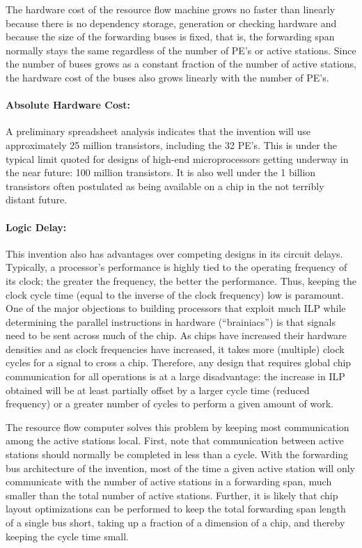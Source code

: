 \documentclass[10pt,dvips]{article}
\begin{document}
The hardware cost of the resource flow machine grows no faster than
linearly because there is no dependency storage, generation or checking
hardware and because the size of the forwarding buses is fixed, that is,
the forwarding span normally stays the same regardless of the number
of PE's or active stations. Since the number of buses grows as a constant
fraction of the number of active stations, the hardware cost of the
buses also grows linearly with the number of PE's.

\paragraph{Absolute Hardware Cost: }
A preliminary spreadsheet analysis indicates that the invention will use
approximately 25 million transistors, including the 32 PE's. This is
under the typical limit quoted for designs of high-end microprocessors
getting underway in the near future: 100 million transistors. It is
also well under the 1 billion transistors often postulated as being
available on a chip in the not terribly distant future.

\paragraph{Logic Delay: }
This invention also has advantages over competing designs in its circuit
delays. Typically, a processor's performance is highly tied to the
operating frequency of its clock; the greater the frequency, the better
the performance. Thus, keeping the clock cycle time (equal to the inverse
of the clock frequency) low is paramount. One of the major objections to
building processors that exploit much ILP while determining the parallel
instructions in hardware (``brainiacs'') is that signals need to be
sent across much of the chip. As chips have increased their hardware
densities and as clock frequencies have increased, it takes more (multiple)
clock cycles for a signal to cross a chip. Therefore, any design that
requires global chip communication for all operations is at a large
disadvantage: the increase in ILP obtained will be at least partially
offset by a larger cycle time (reduced frequency) or a greater number
of cycles to perform a given amount of work.

The resource flow computer solves this problem by keeping most communication
among the active stations local. First, note that communication between
active stations should normally be completed in less than a cycle.
With the forwarding bus architecture of the invention,
most of the time a given active station will only communicate
with the number of active stations in a forwarding span, much smaller than
the total number of active stations. Further, it is likely that chip
layout optimizations can be performed to keep the total forwarding span
length of a single bus short, taking up a fraction of a dimension of a chip,
and thereby keeping the cycle time small.
\end{document}
